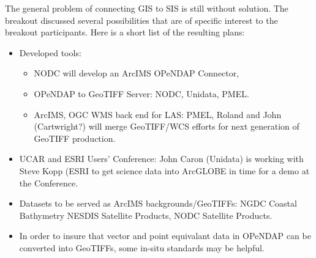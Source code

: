The general problem of connecting \ac{GIS} to \ac{SIS} is still
without solution.  The breakout discussed several possibilities
that are of specific interest to the breakout participants.
Here is a short list of the resulting plans:

\begin{itemize}
  \item Developed tools:  

     \begin{itemize}
        \item \ac{NODC} will develop an ArcIMS \ac{OPeNDAP} Connector,
        \item \ac{OPeNDAP} to \ac{GeoTIFF} Server: \ac{NODC},
Unidata, PMEL.
        \item ArcIMS, \ac{OGC} \ac{WMS} back end for \ac{LAS}: \ac{PMEL},
Roland and John (Cartwright?) will merge \ac{GeoTIFF}/\ac{WCS} efforts
for next generation of \ac{GeoTIFF} production.
      \end{itemize}

    \item \ac{UCAR} and \ac{ESRI} Users' Conference:  John Caron
(Unidata) is working with Steve Kopp (\ac{ESRI} to get science data
into ArcGLOBE in time for a demo at the Conference.

        \item Datasets to be served as ArcIMS backgrounds/GeoTIFFs:
\ac{NGDC} Coastal Bathymetry \ac{NESDIS} Satellite Products, \ac{NODC}
Satellite Products.

        \item  In order to insure that vector and point equivalant data in
\ac{OPeNDAP} can be converted into \ac{GeoTIFF}s, some in-situ standards
may be helpful.
\end{itemize}

%
%
%
%

